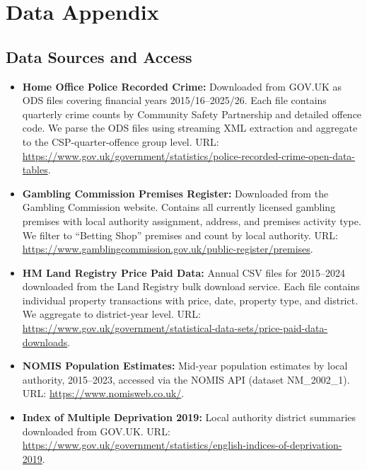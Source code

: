 \documentclass[12pt]{article}
\begin{document}
\section{Data Appendix}
\label{app:data}

\subsection{Data Sources and Access}

\begin{sloppypar}
\begin{itemize}
\item \textbf{Home Office Police Recorded Crime:} Downloaded from GOV.UK as ODS files covering financial years 2015/16--2025/26. Each file contains quarterly crime counts by Community Safety Partnership and detailed offence code. We parse the ODS files using streaming XML extraction and aggregate to the CSP-quarter-offence group level. URL: \url{https://www.gov.uk/government/statistics/police-recorded-crime-open-data-tables}.

\item \textbf{Gambling Commission Premises Register:} Downloaded from the Gambling Commission website. Contains all currently licensed gambling premises with local authority assignment, address, and premises activity type. We filter to ``Betting Shop'' premises and count by local authority. URL: \url{https://www.gamblingcommission.gov.uk/public-register/premises}.

\item \textbf{HM Land Registry Price Paid Data:} Annual CSV files for 2015--2024 downloaded from the Land Registry bulk download service. Each file contains individual property transactions with price, date, property type, and district. We aggregate to district-year level. URL: \url{https://www.gov.uk/government/statistical-data-sets/price-paid-data-downloads}.

\item \textbf{NOMIS Population Estimates:} Mid-year population estimates by local authority, 2015--2023, accessed via the NOMIS API (dataset NM\_2002\_1). URL: \url{https://www.nomisweb.co.uk/}.

\item \textbf{Index of Multiple Deprivation 2019:} Local authority district summaries downloaded from GOV.UK. URL: \url{https://www.gov.uk/government/statistics/english-indices-of-deprivation-2019}.
\end{itemize}
\end{sloppypar}
\end{document}
